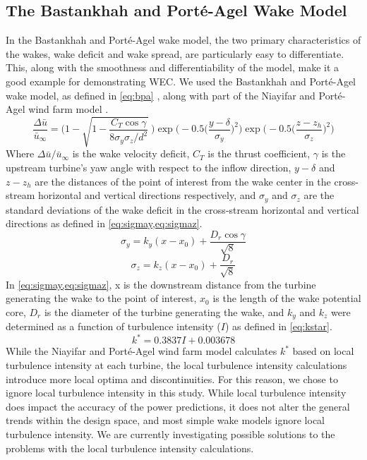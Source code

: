 \documentclass[a4paper]{jpconf}
\begin{document}
\subsection{The Bastankhah and Port\'e-Agel Wake Model}
In the Bastankhah and Port\'e-Agel wake model, the two primary characteristics of the wakes, wake deficit and wake spread, are particularly easy to differentiate. This, along with the smoothness and differentiability of the model, make it a good example for demonstrating WEC. We used the Bastankhah and Port\'e-Agel wake model, as defined in \cref{eq:bpa} \cite{bastankhah2016}, along with part of the Niayifar and Port\'e-Agel wind farm model \cite{niayifar2016}.
%
\begin{equation}
	\frac{\Delta \bar{u}}{\bar{u}_{\infty}} = \Bigg(1-\sqrt{1-\frac{C_T \cos{\gamma}}{8 \sigma_y \sigma_z/d^2}}~\Bigg) \exp{\bigg(-0.5\Big(\frac{y-\delta}{\sigma_y}\Big)^2\bigg)}\exp{\bigg(-0.5\Big(\frac{z-z_h}{\sigma_z}\Big)^2\bigg)}
	 \label{eq:bpa}
\end{equation}
%
Where $\Delta \bar{u} / \bar{u}_{\infty}$ is the wake velocity deficit, $C_T$ is the thrust coefficient, $\gamma$ is the upstream turbine's yaw angle with respect to the inflow direction, $y-\delta$ and $z-z_h$ are the distances of the point of interest from the wake center in the cross-stream horizontal and vertical directions respectively, and $\sigma_y$ and $\sigma_z$ are the standard deviations of the wake deficit in the cross-stream horizontal and vertical directions as defined in \cref{eq:sigmay,eq:sigmaz}.
%
\begin{equation}\label{eq:sigmay}
	\sigma_y = k_y (x - x_0) + \frac{D_r \cos{\gamma}}{\sqrt{8}}
\end{equation}
%
\begin{equation}\label{eq:sigmaz}
	\sigma_z = k_z (x - x_0) + \frac{D_r}{\sqrt{8}}
\end{equation}
%
In \cref{eq:sigmay,eq:sigmaz}, x is the downstream distance from the turbine generating the wake to the point of interest, $x_0$ is the length of the wake potential core, $D_r$ is the diameter of the turbine generating the wake, and $k_y$ and $k_z$ were determined as a function of turbulence intensity ($I$) as defined in \cref{eq:kstar}\cite{niayifar2016}.
%
\begin{equation}\label{eq:kstar}
	k^* = 0.3837I + 0.003678
\end{equation}
%
While the Niayifar and Port\'e-Agel wind farm model calculates $k^*$ based on local turbulence intensity at each turbine, the local turbulence intensity calculations introduce more local optima and discontinuities. For this reason, we chose to ignore local turbulence intensity in this study. While local turbulence intensity does impact the accuracy of the power predictions, it does not alter the general trends within the design space, and most simple wake models ignore local turbulence intensity. We are currently investigating possible solutions to the problems with the local turbulence intensity calculations.
\end{document}
